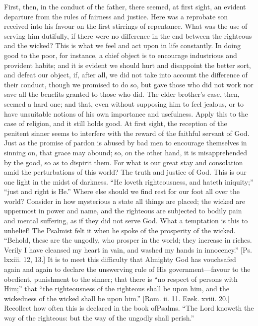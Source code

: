 First, then, in the conduct of the father, there seemed, at first
sight, an evident departure from the rules of fairness and justice.
Here was a reprobate son received into his favour on the first
stirrings of repentance. What was the use of serving him dutifully, if
there were no difference in the end between the righteous and the
wicked? This is what we feel and act upon in life constantly. In doing
good to the poor, for instance, a chief object is to encourage
industrious and provident habits; and it is evident we should hurt and
disappoint the better sort, and defeat our object, if, after all, we
did not take into account the difference of their conduct, though we
promised to do so, but gave those who did not work nor save all the
benefits granted to those who did. The elder brother's case, then,
seemed a hard one; and that, even without supposing him to feel
jealous, or to have unsuitable notions of his own importance and
usefulness. Apply this to the case of religion, and it still holds
good. At first sight, the reception of the penitent sinner seems to
interfere with the reward of the faithful servant of God. Just as the
promise of pardon is abused by bad men to encourage themselves in
sinning on, that grace may abound; so, on the other hand, it is
misapprehended by the good, so as to dispirit them. For what is our
great stay and consolation amid the perturbations of this world? The
truth and justice of God. This is our one light in the midst of
darkness. ``He loveth righteousness, and hateth iniquity;''
``just and right is He.'' Where else should we find rest for
our foot all over the world? Consider in how mysterious a state all
things are placed; the wicked are uppermost in power and name, and the
righteous are subjected to bodily pain and mental suffering, as if
they did not serve God. What a temptation is this to unbelief! The
Psalmist felt it when he spoke of the prosperity of the wicked.
``Behold, these are the ungodly, who prosper in the world; they
increase in riches. Verily I have cleansed my heart in vain, and
washed my hands in innocency.'' [Ps. lxxiii. 12, 13.] It is to
meet this difficulty that Almighty God has vouchsafed again and again
to declare the unswerving rule of His government—favour to the
obedient, punishment to the sinner; that there is ``no respect of
persons with Him;'' that ``the righteousness of the righteous
shall be upon him, and the wickedness of the wicked shall be upon
him.'' [Rom. ii. 11. Ezek. xviii. 20.] Recollect how often this is
declared in the book of\emph{}Psalms. ``The Lord knoweth the way
of the righteous: but the way of the ungodly shall perish.''
